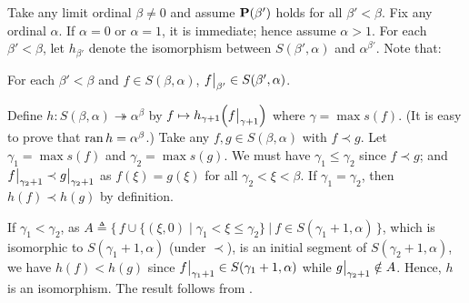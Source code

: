 \documentclass[../introduction_to_set_theory_Note.tex]{subfiles}
\begin{document}
{    Take any limit ordinal \(\beta \neq 0\) and assume
    \(\bm{\mathrm{P}}(\beta')\) holds for all \(\beta' < \beta\).
    Fix any ordinal \(\alpha\).
    If \(\alpha = 0\) or \(\alpha = 1\), it is immediate; hence assume \(\alpha > 1\).
    For each \(\beta' < \beta\), let \(h_{\beta'}\) denote the
    isomorphism between \(S(\beta', \alpha)\) and \(\alpha^{\beta'}\).
    Note that:
    \begin{itemize}[nolistsep, leftmargin=*, listparindent=\parindent]
        \ii
        For each \(\beta' < \beta\) and \(f \in S(\beta, \alpha)\),
        \(\restr{f}{\beta'} \in S(\beta', \alpha)\).
    \end{itemize}

    Define \(h \colon S(\beta, \alpha) \twoheadrightarrow \alpha^\beta\)
    by \(f \mapsto h_{\gamma + 1}\!\left(\restr{f}{\gamma + 1}\right)\) where \(\gamma = \max s(f)\).
    (It is easy to prove that \(\operatorname{ran} h = \alpha^\beta\).)
    Take any \(f, g \in S(\beta, \alpha)\) with \(f \prec g\).
    Let \(\gamma_1 = \max s(f)\) and \(\gamma_2 = \max s(g)\).
    We must have \(\gamma_1 \le \gamma_2\) since \(f \prec g\);
    and \(\restr{f}{\gamma_2 + 1} \prec \restr{g}{\gamma_2+1}\)
    as \(f(\xi) = g(\xi)\) for all \(\gamma_2 < \xi < \beta\).
    If \(\gamma_1 = \gamma_2\), then \(h(f) \prec h(g)\) by definition.

    If \(\gamma_1 < \gamma_2\), as \(A \triangleq \big\{\,f \cup \{(\xi, 0) \mid \gamma_1 < \xi \le \gamma_2\}
    \:\big|\: f \in S(\gamma_1 + 1, \alpha) \,\big\}\),
    which is isomorphic to \(S(\gamma_1 + 1, \alpha)\) (under \(\prec\)),
    is an initial segment of \(S(\gamma_2 + 1 ,\alpha)\),
    we have \(h(f) < h(g)\)
    since \(\restr{f}{\gamma_1 + 1} \in S(\gamma_1 + 1, \alpha)\)
    while \(\restr{g}{\gamma_2 + 1} \notin A\).
    Hence, \(h\) is an isomorphism.
    The result follows from .
}
\end{document}
